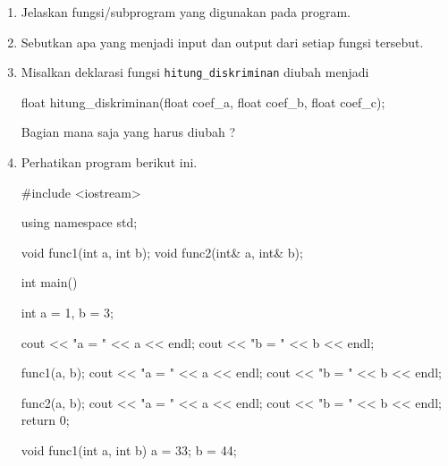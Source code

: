 \documentclass[a4paper,11pt]{extarticle}
\begin{document}
\begin{enumerate}
\item Jelaskan fungsi/subprogram yang digunakan pada program.
\item Sebutkan apa yang menjadi input dan output dari setiap fungsi tersebut.
\item Misalkan deklarasi fungsi \texttt{hitung\_diskriminan} diubah menjadi
\begin{cppcode}
float hitung_diskriminan(float coef_a, float coef_b, float coef_c);
\end{cppcode}
Bagian mana saja yang harus diubah ?
%
\item Perhatikan program berikut ini.
\begin{cppcode}
#include <iostream>

using namespace std;

void func1(int a, int b);
void func2(int& a, int& b);

int main()
{
  int a = 1, b = 3;

  cout << "a = " << a << endl;
  cout << "b = " << b << endl;

  func1(a, b);
  cout << "a = " << a << endl;
  cout << "b = " << b << endl;
 
  func2(a, b);
  cout << "a = " << a << endl;
  cout << "b = " << b << endl;
  return 0;
}

void func1(int a, int b)
{
  a = 33;
  b = 44;
}


\end{cppcode}
\end{enumerate}
\end{document}

